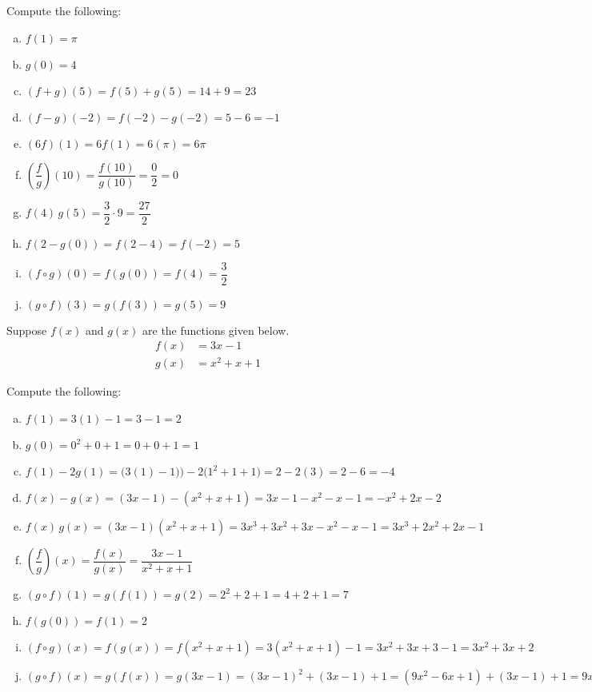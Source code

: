 \documentclass[11pt,letterpaper]{article}
\begin{document}
Compute the following: \pspace
        \begin{enumerate}[(a)]
        \item $f(1)= \pi$ \vfill
        \item $g(0)= 4$ \vfill
        \item $(f + g)(5)= f(5) + g(5)= 14 + 9= 23$ \vfill
        \item $(f - g)(-2)= f(-2) - g(-2)= 5 - 6= -1$ \vfill
        \item $(6f)(1)= 6f(1)= 6(\pi)= 6\pi$ \vfill
        \item $\left(\dfrac{f}{g}\right)(10)= \dfrac{f(10)}{g(10)}= \dfrac{0}{2}= 0$ \vfill
        \item $f(4)\, g(5)= \dfrac{3}{2} \cdot 9= \dfrac{27}{2}$ \vfill
        \item $f(2 - g(0))= f(2 - 4)= f(-2)= 5$ \vfill
        \item $(f \circ g)(0)= f(g(0))= f(4)= \dfrac{3}{2}$ \vfill
        \item $(g \circ f)(3)= g(f(3))= g(5)= 9$ \vfill
        \end{enumerate}





\newpage





 Suppose $f(x)$ and $g(x)$ are the functions given below. 
	\[
	\begin{aligned}
	f(x)&= 3x - 1 \\[0.3cm]
	g(x)&= x^2 + x + 1
	\end{aligned}
	\]

Compute the following: \pspace
\begin{enumerate}[(a)]
\item $f(1)= 3(1) - 1= 3 - 1= 2$ \vfill
\item $g(0)= 0^2 + 0 + 1= 0 + 0 + 1= 1$ \vfill
\item $f(1) - 2g(1)= \big( 3(1) - 1) \big) - 2 \big(1^2 + 1 + 1 \big)= 2 - 2(3)= 2- 6= -4$ \vfill
\item $f(x) - g(x)= (3x - 1) - (x^2 + x + 1)= 3x - 1 - x^2 - x - 1= -x^2 + 2x - 2$ \vfill
\item $f(x) \, g(x)= (3x - 1)(x^2 + x + 1)= 3x^3 + 3x^2 + 3x - x^2 -x - 1= 3x^3 + 2x^2 + 2x - 1$ \vfill
\item $\left( \dfrac{f}{g} \right)(x)= \dfrac{f(x)}{g(x)}= \dfrac{3x - 1}{x^2 + x + 1}$ \vfill
\item $(g \circ f)(1)= g(f(1))= g(2)= 2^2 + 2 + 1= 4 + 2 + 1= 7$ \vfill
\item $f(g(0))= f(1)= 2$ \vfill
\item $(f \circ g)(x)= f(g(x))= f(x^2 + x + 1)= 3(x^2 + x + 1) - 1= 3x^2 + 3x + 3 - 1= 3x^2 + 3x + 2$ \vfill
\item $(g \circ f)(x)= g(f(x))= g(3x - 1)= (3x - 1)^2 + (3x - 1) + 1= (9x^2 - 6x + 1) + (3x - 1) + 1= 9x^2 -3x + 1$ \vfill
\end{enumerate}


\end{document}
